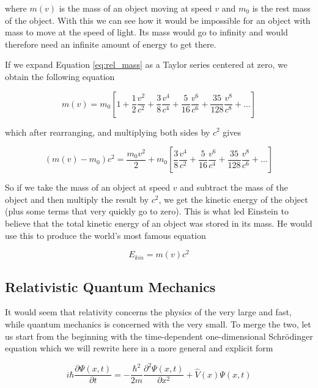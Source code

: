 where $m(v)$ is the mass of an object moving at speed $v$ and $m_{0}$ is the rest mass of the object. With this we can see how it would be impossible for an object with mass to move at the speed of light. Its mass would go to infinity and would therefore need an infinite amount of energy to get there.

If we expand Equation \ref{eq:rel_mass} as a Taylor series centered at zero, we obtain the following equation

\begin{equation}
\label{eq:rel_mass_taylor}
m(v) = m_{0}\left[1 + \frac{1}{2}\frac{v^{2}}{c^{2}} + \frac{3}{8}\frac{v^{4}}{c^{4}} + \frac{5}{16}\frac{v^{6}}{c^{6}} + \frac{35}{128}\frac{v^{8}}{c^{8}} + \ldots\right]
\end{equation}

which after rearranging, and multiplying both sides by $c^{2}$ gives

\begin{equation}
\label{eq:rel_mass_taylor_rea}
(m(v) -  m_{0})c^{2}= \frac{m_{0}v^{2}}{2} + m_{0}\left[\frac{3}{8}\frac{v^{4}}{c^{2}} + \frac{5}{16}\frac{v^{6}}{c^{4}} + \frac{35}{128}\frac{v^{8}}{c^{6}} + \ldots\right]
\end{equation}

So if we take the mass of an object at speed $v$ and subtract the mass of the object and then multiply the result by $c^{2}$, we get the kinetic energy of the object (plus some terms that very quickly go to zero). This is what led Einstein to believe that the total kinetic energy of an object was stored in its mass. He would use this to produce the world's most famous equation

\begin{equation}
\label{eq:emc2}
E_{kin} = m(v)c^{2}
\end{equation}

\subsection{Relativistic Quantum Mechanics}
It would seem that relativity concerns the physics of the very large and fast, while quantum mechanics is concerned with the very small. To merge the two, let us start from the beginning with the time-dependent one-dimensional Schr\"{o}dinger equation which we will rewrite here in a more general and explicit form\cite{1926PhRv...28.1049S}

\begin{equation}
\label{eq:schr_full}
i\hbar\frac{\partial\Psi(x, t)}{\partial t} = -\frac{\hbar^{2}}{2m}\frac{\partial^{2}\Psi(x, t)}{\partial x^{2}} + \hat{V}(x)\Psi(x, t)
\end{equation}

